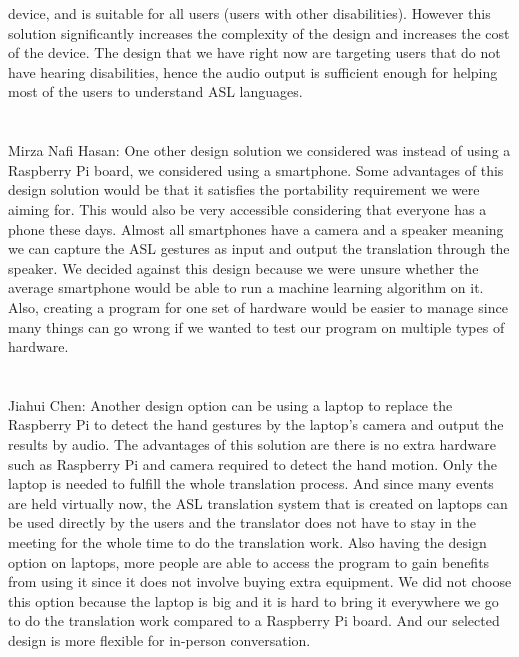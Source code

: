 \documentclass[12pt, titlepage]{article}
\begin{document}
\begin{enumerate}
  device, and is suitable for all users (users with other disabilities). However this solution significantly increases the complexity of the design and 
  increases the cost of the device. The design that we have right now are targeting users that do not have hearing disabilities, hence the audio output 
  is sufficient enough for helping most of the users to understand ASL languages.
  \\
  ~\\
  \\
    Mirza Nafi Hasan: One other design solution we considered was instead of using a Raspberry Pi board, we considered using a smartphone. Some advantages of 
    this design solution would be that it satisfies the portability requirement we were aiming for. This would also be very accessible considering that everyone
    has a phone these days. Almost all smartphones have a camera and a speaker meaning we can capture the ASL gestures as input and output the translation 
    through the speaker. We decided against this design because we were unsure whether the average smartphone would be able to run a machine learning algorithm
    on it. Also, creating a program for one set of hardware would be easier to manage since many things can go wrong if we wanted to test our program on 
    multiple types of hardware.
    \\
    ~\\
    \\
  Jiahui Chen: Another design option can be using a laptop to replace the Raspberry Pi to detect the hand gestures by the laptop's camera and output the results by audio. The advantages of this solution are there is no extra hardware such as Raspberry Pi and camera required to detect the hand motion. Only the laptop is needed to fulfill the whole translation process. And since many events are held virtually now, the ASL translation system that is created on laptops can be used directly by the users and the translator does not have to stay in the meeting for the whole time to do the translation work. Also having the design option on laptops, more people are able to access the program to gain benefits from using it since it does not involve buying extra equipment. We did not choose this option because the laptop is big and it is hard to  bring it everywhere we go to do the translation work compared to a Raspberry Pi board. And our selected design is more flexible for in-person conversation.  
  \\
\end{enumerate}
\end{document}
